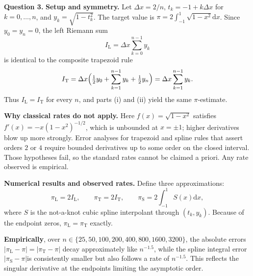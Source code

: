 \documentclass[11pt]{article}
\theoremstyle{definition}
\begin{document}
\newpage



{\bf Question 3.}
\textbf{Setup and symmetry.}
Let \(\Delta x=2/n\), \(t_{k}=-1+k\Delta x\) for \(k=0,\dots,n\), and \(y_{k}=\sqrt{1-t_{k}^{2}}\).
The target value is \(\pi=2\int_{-1}^{1}\sqrt{1-x^{2}}\mathrm{d}x\).
Since \(y_{0}=y_{n}=0\), the left Riemann sum
\[
I_{\mathrm{L}}=\Delta x\sum_{k=0}^{n-1}y_{k}
\]
is identical to the composite trapezoid rule
\[
I_{\mathrm{T}}=\Delta x\Bigl(\tfrac{1}{2}y_{0}+\sum_{k=1}^{n-1}y_{k}+\tfrac{1}{2}y_{n}\Bigr)
=\Delta x\sum_{k=1}^{n-1}y_{k}.
\]
Thus \(I_{\mathrm{L}}=I_{\mathrm{T}}\) for every \(n\), and parts (i) and (ii) yield the same \(\pi\)-estimate.

\textbf{Why classical rates do not apply.}
Here \(f(x)=\sqrt{1-x^{2}}\) satisfies \(f'(x)=-x(1-x^{2})^{-1/2}\), which is unbounded at \(x=\pm1\); higher derivatives blow up more strongly. Error analyses for trapezoid and spline rules that assert orders \(2\) or \(4\) require bounded derivatives up to some order on the closed interval. Those hypotheses fail, so the standard rates cannot be claimed a priori. Any rate observed is empirical.

\textbf{Numerical results and observed rates.}
Define three approximations:
\[
\pi_{\mathrm{L}}=2I_{\mathrm{L}},\qquad
\pi_{\mathrm{T}}=2I_{\mathrm{T}},\qquad
\pi_{\mathrm{S}}=2\int_{-1}^{1}S(x)\mathrm{d}x,
\]
where \(S\) is the not-a-knot cubic spline interpolant through \((t_{k},y_{k})\). Because of the endpoint zeros, \(\pi_{\mathrm{L}}=\pi_{\mathrm{T}}\) exactly.

\textbf{Empirically}, over \(n\in\{25,50,100,200,400,800,1600,3200\}\), the absolute errors \(|\pi_{\mathrm{L}}-\pi|=|\pi_{\mathrm{T}}-\pi|\) decay approximately like \(n^{-1.5}\), while the spline integral error \(|\pi_{\mathrm{S}}-\pi|\)is consistently smaller but also follows a rate of \(n^{-1.5}\). This reflects the singular derivative at the endpoints limiting the asymptotic order.
\end{document}

